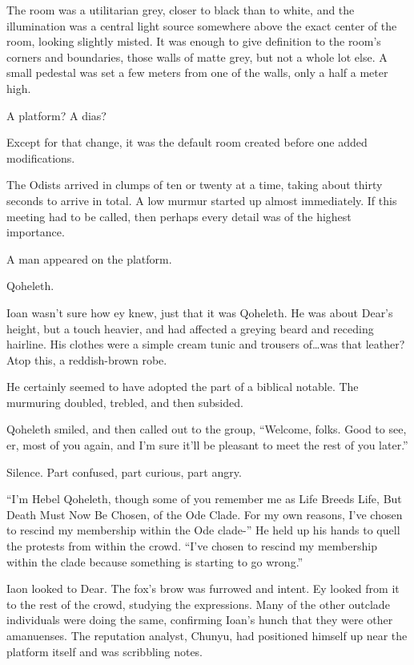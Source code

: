 The room was a utilitarian grey, closer to black than to white, and the illumination was a central light source somewhere above the exact center of the room, looking slightly misted. It was enough to give definition to the room's corners and boundaries, those walls of matte grey, but not a whole lot else. A small pedestal was set a few meters from one of the walls, only a half a meter high.

A platform? A dias?

Except for that change, it was the default room created before one added modifications.

The Odists arrived in clumps of ten or twenty at a time, taking about thirty seconds to arrive in total. A low murmur started up almost immediately. If this meeting had to be called, then perhaps every detail was of the highest importance.

A man appeared on the platform.

Qoheleth.

Ioan wasn't sure how ey knew, just that it was Qoheleth. He was about Dear's height, but a touch heavier, and had affected a greying beard and receding hairline. His clothes were a simple cream tunic and trousers of\ldots{}was that leather? Atop this, a reddish-brown robe.

He certainly seemed to have adopted the part of a biblical notable. The murmuring doubled, trebled, and then subsided.

Qoheleth smiled, and then called out to the group, ``Welcome, folks. Good to see, er, most of you again, and I'm sure it'll be pleasant to meet the rest of you later.''

Silence. Part confused, part curious, part angry.

``I'm Hebel Qoheleth, though some of you remember me as Life Breeds Life, But Death Must Now Be Chosen, of the Ode Clade. For my own reasons, I've chosen to rescind my membership within the Ode clade-'' He held up his hands to quell the protests from within the crowd. ``I've chosen to rescind my membership within the clade because something is starting to go wrong.''

Iaon looked to Dear. The fox's brow was furrowed and intent. Ey looked from it to the rest of the crowd, studying the expressions. Many of the other outclade individuals were doing the same, confirming Ioan's hunch that they were other amanuenses. The reputation analyst, Chunyu, had positioned himself up near the platform itself and was scribbling notes.

